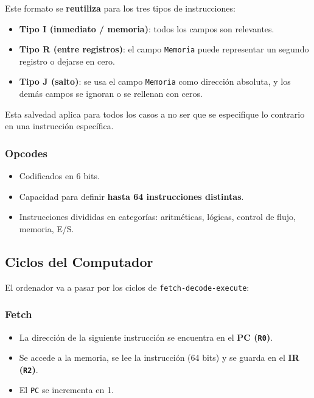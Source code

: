 \documentclass{article}
\begin{document}
Este formato se \textbf{reutiliza} para los tres tipos de instrucciones:

\begin{itemize}
    \item \textbf{Tipo I (inmediato / memoria)}: todos los campos son relevantes.
    \item \textbf{Tipo R (entre registros)}: el campo \texttt{Memoria} puede representar un segundo registro o dejarse en cero.
    \item \textbf{Tipo J (salto)}: se usa el campo \texttt{Memoria} como dirección absoluta, y los demás campos se ignoran o se rellenan con ceros.
\end{itemize}

Esta salvedad aplica para todos los casos a no ser que se especifique lo contrario en una instrucción específica.

\subsubsection{Opcodes}

\begin{itemize}
    \item Codificados en 6 bits.
    \item Capacidad para definir \textbf{hasta 64 instrucciones distintas}.
    \item Instrucciones divididas en categorías: aritméticas, lógicas, control de flujo, memoria, E/S.
\end{itemize}


\subsection{Ciclos del Computador}

El ordenador va a pasar por los ciclos de \texttt{fetch-decode-execute}:

\subsubsection{Fetch}

\begin{itemize}
    \item La dirección de la siguiente instrucción se encuentra en el \textbf{PC (\texttt{R0})}.
    \item Se accede a la memoria, se lee la instrucción (64 bits) y se guarda en el \textbf{IR (\texttt{R2})}.
    \item El \texttt{PC} se incrementa en 1.
\end{itemize}
\end{document}

